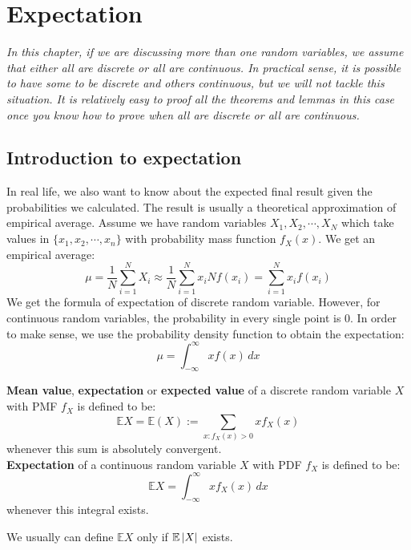 \documentclass{huhtakm-template-book}
\newcommand{\expect}{\mathbb{E}}
\begin{document}
\chapter{Expectation}
\textit{In this chapter, if we are discussing more than one random variables, we assume that either all are discrete or all are continuous. In practical sense, it is possible to have some to be discrete and others continuous, but we will not tackle this situation. It is relatively easy to proof all the theorems and lemmas in this case once you know how to prove when all are discrete or all are continuous.}
\section{Introduction to expectation}
In real life, we also want to know about the expected final result given the probabilities we calculated. The result is usually a theoretical approximation of empirical average. Assume we have random variables $X_{1},X_{2},\cdots,X_{N}$ which take values in $\{x_{1},x_{2},\cdots,x_{n}\}$ with probability mass function $f_{X}(x)$. We get an empirical average:
\begin{equation*}
	\mu=\frac{1}{N}\sum_{i=1}^{N}X_{i}\approx\frac{1}{N}\sum_{i=1}^{N}x_{i}Nf(x_{i})=\sum_{i=1}^{N}x_{i}f(x_{i})
\end{equation*}
We get the formula of expectation of discrete random variable. However, for continuous random variables, the probability in every single point is $0$. In order to make sense, we use the probability density function to obtain the expectation:
\begin{equation*}
	\mu=\int_{-\infty}^{\infty}xf(x)\,dx
\end{equation*}
\begin{defn}
	\textbf{Mean value}, \textbf{expectation} or \textbf{expected value} of a discrete random variable $X$ with PMF $f_{X}$ is defined to be:
	\begin{equation*}
		\expect{X}=\expect(X):=\sum_{x:f_{X}(x)>0}xf_{X}(x)
	\end{equation*}
	whenever this sum is absolutely convergent.\\
	\textbf{Expectation} of a continuous random variable $X$ with PDF $f_{X}$ is defined to be:
	\begin{equation*}
		\expect{X}=\int_{-\infty}^{\infty}xf_{X}(x)\,dx
	\end{equation*}
	whenever this integral exists.
\end{defn}
\begin{rem}
	We usually can define $\expect{X}$ only if $\expect\abs{X}$ exists.
\end{rem}
\end{document}
